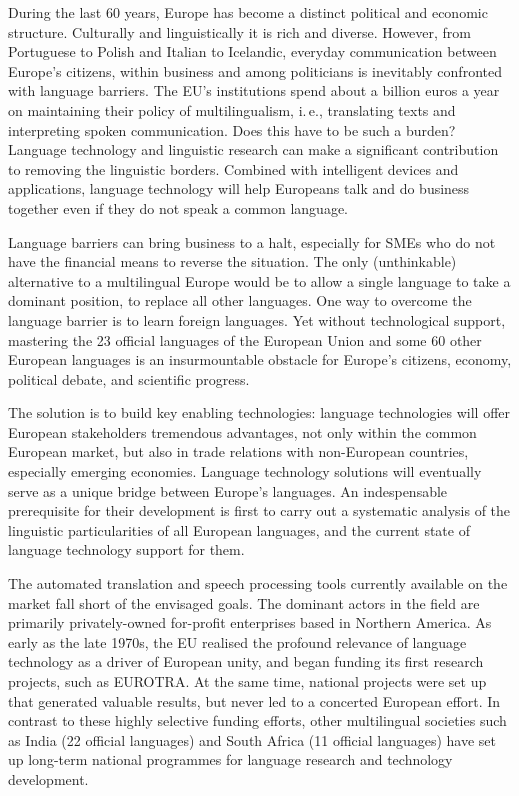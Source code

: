 \documentclass[]{../../metanetpaper}
\begin{document}
\begin{multicols}{2}

During the last 60 years, Europe has become a distinct political and economic structure. Culturally and linguistically it is rich and diverse. However, from Portuguese to Polish and Italian to Icelandic, everyday communication between Europe’s citizens, within business and among politicians is inevitably confronted with language barriers. The EU's institutions spend about a billion euros a year on maintaining their policy of multilingualism, i.\,e., translating texts and interpreting spoken communication. Does this have to be such a burden? Language technology and linguistic research can make a significant contribution to removing the linguistic borders. Combined with intelligent devices and applications, language technology will help Europeans talk and do business together even if they do not speak a common language. 


Language barriers can bring business to a halt, especially for SMEs who do not have the financial means to reverse the situation. The only (unthinkable) alternative to a multilingual Europe would be to allow a single language to take a dominant position, to replace all other languages. One way to overcome the language barrier is to learn foreign languages. Yet without technological support, mastering the 23 official languages of the European Union and some 60 other European languages is an insurmountable obstacle for Europe’s citizens, economy, political debate, and scientific progress.

The solution is to build key enabling technologies: language technologies will offer European stakeholders tremendous advantages, not only within the common European market, but also in trade relations with non-European countries, especially emerging economies. Language technology solutions will eventually serve as a unique bridge between Europe's languages. An indespensable prerequisite for their development is first to carry out a systematic analysis of the linguistic particularities of all European languages, and the current state of language technology support for them.  
    
The automated translation and speech processing tools currently available on the market fall short of the envisaged goals. The dominant actors in the field are primarily privately-owned for-profit enterprises based in Northern America. As early as the late 1970s, the EU realised the profound relevance of language technology as a driver of European unity, and began funding its first research projects, such as EUROTRA. At the same time, national projects were set up that generated valuable results, but never led to a concerted European effort. In contrast to these highly selective funding efforts, other multilingual societies such as India (22 official languages) and South Africa (11 official languages) have set up long-term national programmes for language research and technology development. 


\end{multicols}
\end{document}
